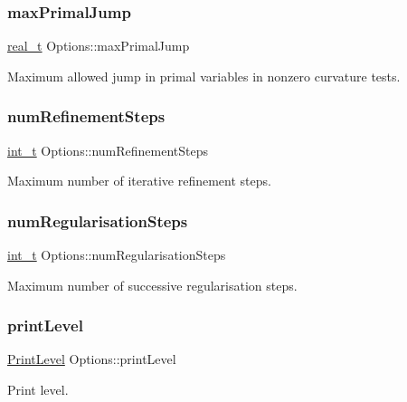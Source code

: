 \subsubsection{\texorpdfstring{max\+Primal\+Jump}{maxPrimalJump}}
{\footnotesize\ttfamily \hyperlink{qp_o_a_s_e_s__wrapper_8h_a0d00e2b3dfadee81331bbb39068570c4}{real\+\_\+t} Options\+::max\+Primal\+Jump}

Maximum allowed jump in primal variables in nonzero curvature tests. \mbox{\label{class_options_a4c9f296e726a52eebbb7cee034c60ad8}} 
\subsubsection{\texorpdfstring{num\+Refinement\+Steps}{numRefinementSteps}}
{\footnotesize\ttfamily \hyperlink{_types_8hpp_ab6fd6105e64ed14a0c9281326f05e623}{int\+\_\+t} Options\+::num\+Refinement\+Steps}

Maximum number of iterative refinement steps. \mbox{\label{class_options_a82347700b27bb1af11879b42f0bef6ce}} 
\subsubsection{\texorpdfstring{num\+Regularisation\+Steps}{numRegularisationSteps}}
{\footnotesize\ttfamily \hyperlink{_types_8hpp_ab6fd6105e64ed14a0c9281326f05e623}{int\+\_\+t} Options\+::num\+Regularisation\+Steps}

Maximum number of successive regularisation steps. \mbox{\label{class_options_a3c7327943ce25f36479356d33a0b0723}} 
\subsubsection{\texorpdfstring{print\+Level}{printLevel}}
{\footnotesize\ttfamily \hyperlink{_types_8hpp_a83ff212f474e3669d8fac2d727f65de5}{Print\+Level} Options\+::print\+Level}

Print level. \mbox{\label{class_options_abb00b9be9b9988884954bbe905ae317f}} 
